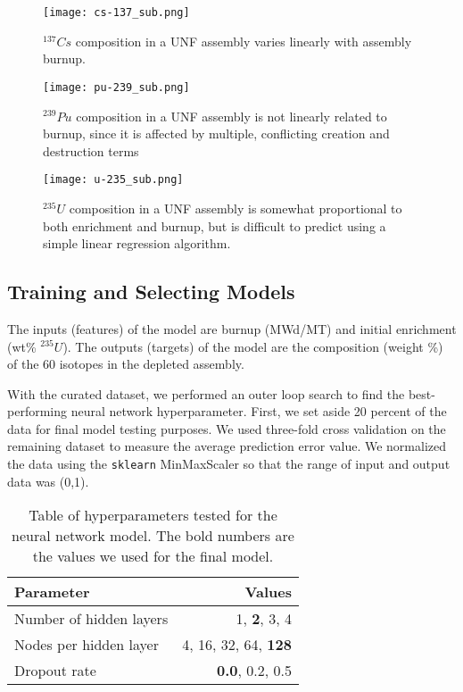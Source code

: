 \begin{figure}
    \centering
    \texttt{[image: cs-137\_sub.png]}
    \caption{$^{137}Cs$ composition in a \gls{UNF} assembly
             varies linearly with assembly burnup.}
    \label{fig:cs_137}
\end{figure}

\begin{figure}
    \centering
    \texttt{[image: pu-239\_sub.png]}
    \caption{$^{239}Pu$ composition in a \gls{UNF} assembly
             is not linearly related to burnup, since it
             is affected by multiple, conflicting creation
             and destruction terms}
    \label{fig:pu_239}
\end{figure}


\begin{figure}
    \centering
    \texttt{[image: u-235\_sub.png]}
    \caption{$^{235}U$ composition in a \gls{UNF} assembly
             is somewhat proportional to both enrichment and
             burnup, but is difficult to predict using
             a simple linear regression algorithm.}
    \label{fig:u_235}
\end{figure}


\subsection{Training and Selecting Models}

The inputs (features) of the model are
burnup (MWd/MT) and initial enrichment (wt\% $^{235}U$).
The outputs (targets) of the model are
the composition (weight \%) of the 60 isotopes in the
depleted assembly.

With the curated dataset, we performed an outer loop
search to find the best-performing neural network
hyperparameter. First, we set aside 20 percent of the 
data for final model testing purposes. We used three-fold
cross validation \cite{stone1974cross} on the remaining
dataset to
measure the average prediction error value. We
normalized the data using the \texttt{sklearn} MinMaxScaler
so that the range of input and output data was (0,1).

\begin{table}[h]
    \centering
    \begin{tabular}{lr}
        \hline
        Parameter & Values \\
        \hline
        Number of hidden layers & 1, \textbf{2}, 3, 4 \\
        Nodes per hidden layer & 4, 16, 32, 64, \textbf{128} \\
        Dropout rate & \textbf{0.0}, 0.2, 0.5 \\
        \hline
    \end{tabular}
    \caption{Table of hyperparameters tested
             for the neural network model. The bold
             numbers are the values we used for the final model.}
\end{table}


